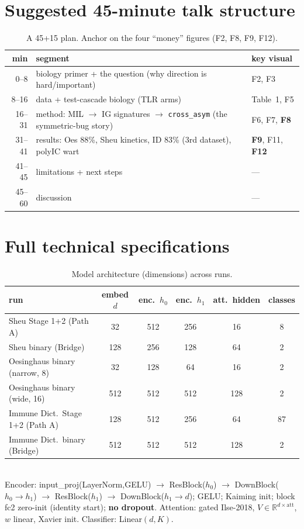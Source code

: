 \documentclass[11pt]{article}
\newcommand{\code}[1]{\texttt{\small #1}}
\newcommand{\cross}{\code{cross\_asym}}
\begin{document}
\section{Suggested 45-minute talk structure}\label{sec:talk}
\begin{table}[h]\centering\small
\caption{A 45+15 plan. Anchor on the four ``money'' figures (F2, F8, F9, F12).}
\begin{tabular}{@{}rll@{}}
\toprule
min & segment & key visual \\
\midrule
0--8   & biology primer + the question (why direction is hard/important) & F2, F3 \\
8--16  & data + test-cascade biology (TLR arms) & Table~1, F5 \\
16--31 & method: MIL $\to$ IG signatures $\to$ \cross{} (the symmetric-bug story) & F6, F7, \textbf{F8} \\
31--41 & results: Oes 88\%, Sheu kinetics, ID 83\% (3rd dataset), polyIC wart & \textbf{F9}, F11, \textbf{F12} \\
41--45 & limitations + next steps & --- \\
45--60 & discussion & --- \\
\bottomrule
\end{tabular}
\end{table}

\appendix
\section{Full technical specifications}\label{app:tech}

\begin{table}[h]\centering\small
\caption{Model architecture (dimensions) across runs.}\label{tab:arch}
\begin{tabular}{@{}lccccc@{}}
\toprule
run & embed $d$ & enc.\ $h_0$ & enc.\ $h_1$ & att.\ hidden & classes \\
\midrule
Sheu Stage 1+2 (Path A)         & 32  & 512 & 256 & 16  & 8 \\
Sheu binary (Bridge)            & 128 & 256 & 128 & 64  & 2 \\
Oesinghaus binary (narrow, 8)   & 32  & 128 & 64  & 16  & 2 \\
Oesinghaus binary (wide, 16)    & 512 & 512 & 512 & 128 & 2 \\
Immune Dict.\ Stage 1+2 (Path A) & 128 & 512 & 256 & 64  & 87 \\
Immune Dict.\ binary (Bridge)    & 512 & 512 & 512 & 128 & 2 \\
\bottomrule
\end{tabular}\\[2pt]
{\scriptsize Encoder: input\_proj(LayerNorm,GELU) $\to$ ResBlock($h_0$) $\to$
DownBlock($h_0\!\to\!h_1$) $\to$ ResBlock($h_1$) $\to$ DownBlock($h_1\!\to\!d$);
GELU; Kaiming init; block fc2 zero-init (identity start); \textbf{no dropout}.
Attention: gated Ilse-2018, $V\!\in\!\mathbb{R}^{d\times\text{att}}$, $w$ linear,
Xavier init. Classifier: Linear$(d,K)$.}
\end{table}
\end{document}
